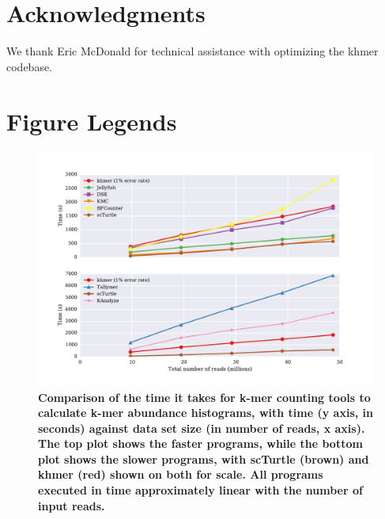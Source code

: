 \documentclass[10pt]{article}
\begin{document}

 
\section*{Acknowledgments}

We thank Eric McDonald for technical assistance with optimizing the khmer codebase.


%



\clearpage

\section*{Figure Legends}




\begin{figure}[!ht]
\centerline{\includegraphics[width=5in]{./figure/time_benchmark}}

\caption{\bf Comparison of the time it takes for k-mer counting tools
  to calculate k-mer abundance histograms, with time (y axis, in
  seconds) against data set size (in number of reads, x axis).  The
  top plot shows the faster programs, while the bottom plot shows the
  slower programs, with scTurtle (brown) and khmer (red) shown on both
  for scale.  All programs executed in time approximately linear with
  the number of input reads.}

\label{fig:cmp_time}
\end{figure}
\end{document}
